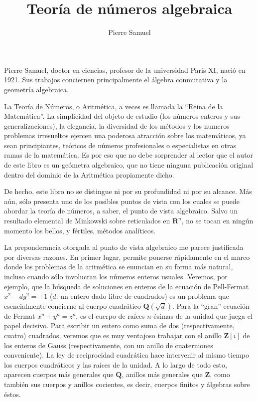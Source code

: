 \documentclass[oneside,bibtotoc,leqno,spanish]{amsbook}
\title{Teor\'ia de n\'umeros algebraica}
\author{Pierre Samuel}
\date{}
\newcommand{\RR}{\mathbf{R}}
\newcommand{\QQ}{\mathbf{Q}}
\newcommand{\ZZ}{\mathbf{Z}}
\numberwithin{equation}{section}
\theoremstyle{defi}
\theoremstyle{note}
\theoremstyle{rem}
\numberwithin{theorem}{section}
\numberwithin{proposition}{section}
\numberwithin{definition}{section}
\numberwithin{lemma}{section}
\numberwithin{corollary}{section}
\numberwithin{example}{section}
\numberwithin{footnote}{section}%
\begin{document}
\frontmatter

\maketitle

\newpage

\phantom{.}\vfill
\noindent
Pierre Samuel, doctor en ciencias, profesor de la universidad Paris XI, naci\'o en 1921.
Sus trabajos conciernen principalmente el \'algebra conmutativa y la geometr\'ia algebraica.

\vfill\vfill

\tableofcontents


La Teor\'ia de N\'umeros, o Aritm\'etica, a veces es llamada
la ``Reina de la Matem\'atica''. La simplicidad del objeto
de estudio (los n\'umeros enteros y sus generalizaciones), la elegancia,
la diversidad de los m\'etodos y los numeros problemas irresueltos
ejercen una poderosa atracci\'on sobre los matem\'aticos,
ya sean principiantes, te\'oricos de n\'umeros profesionales o
especialistas en otras ramas de la matem\'atica. Es por eso que no
debe sorprender al lector que el autor de este libro es un ge\'ometra
algebraico, que no tiene ninguna publicaci\'on original dentro
del dominio de la Aritm\'etica propiamente dicho.

De hecho, este libro no se distingue ni por su profundidad ni
por su alcance. M\'as a\'un, s\'olo presenta uno de los posibles
puntos de vista con los cuales se puede abordar la teor\'ia de n\'umeros,
a saber, el punto de vista algebraico. Salvo un resultado elemental
de Minkowski sobre reticulados en $\RR^{n}$, no se tocan en ning\'un
momento los bellos, y f\'ertiles, m\'etodos anal\'iticos.

La preponderancia otorgada al punto de vista algebraico me parece
justificada por diversas razones. En primer lugar, permite ponerse
r\'apidamente en el marco donde los problemas de la aritm\'etica
se enuncian en su forma
m\'as natural, incluso cuando s\'olo involucran los n\'umeros enteros
usuales. Veremos, por ejemplo, que la b\'usqueda de soluciones
en enteros de la ecuaci\'on de {Pell-Fermat} $x^{2}-dy^{2}=\pm 1$
($d$: un entero dado libre de cuadrados) es un problema que esencialmente
concierne al cuerpo cuadr\'atico $\QQ(\sqrt{d})$. Para la
``gran'' ecuaci\'on de {Fermat} $x^{n}+y^{n}=z^{n}$, es el cuerpo de
ra\'ices  $n$-\'esimas de la unidad que juega el papel decisivo.
Para escribir un entero como suma de dos (respectivamente, cuatro)
cuadrados, veremos que es muy ventajoso trabajar con el anillo
$\ZZ[i]$ de los enteros de Gauss (respectivamente, con un
anillo de cuaterniones conveniente). La ley de reciprocidad
cuadr\'atica hace intervenir al mismo tiempo los cuerpos cuadr\'aticos y las ra\'ices de
la unidad. A lo largo de todo esto, aparecen cuerpos m\'as generales que
$\QQ$, anillos m\'as generales que $\ZZ$, como tambi\'en sus cuerpos y
anillos cocientes, es decir, cuerpos finitos y \'algebras
sobre \'estos.
\end{document}
